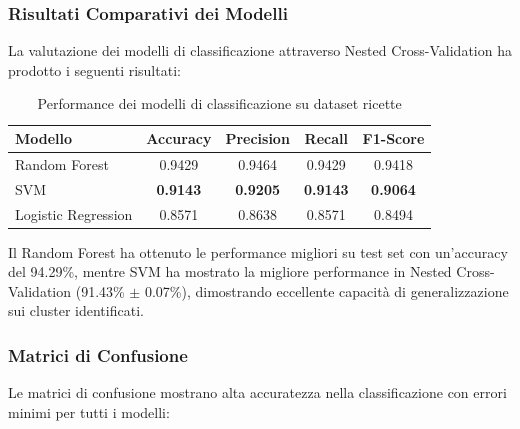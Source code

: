 \documentclass[12pt,a4paper]{article}
\begin{document}
\subsubsection{Risultati Comparativi dei Modelli}

La valutazione dei modelli di classificazione attraverso Nested Cross-Validation ha prodotto i seguenti risultati:

\begin{table}[H]
\centering
\begin{tabular}{@{}lcccc@{}}
\toprule
\textbf{Modello} & \textbf{Accuracy} & \textbf{Precision} & \textbf{Recall} & \textbf{F1-Score} \\
\midrule
Random Forest & 0.9429 & 0.9464 & 0.9429 & 0.9418 \\
SVM & \textbf{0.9143} & \textbf{0.9205} & \textbf{0.9143} & \textbf{0.9064} \\
Logistic Regression & 0.8571 & 0.8638 & 0.8571 & 0.8494 \\
\bottomrule
\end{tabular}
\caption{Performance dei modelli di classificazione su dataset ricette}
\label{tab:classification_results}
\end{table}

Il Random Forest ha ottenuto le performance migliori su test set con un'accuracy del 94.29\%, mentre SVM ha mostrato la migliore performance in Nested Cross-Validation (91.43\% $\pm$ 0.07\%), dimostrando eccellente capacit\`a di generalizzazione sui cluster identificati.

\subsubsection{Matrici di Confusione}

Le matrici di confusione mostrano alta accuratezza nella classificazione con errori minimi per tutti i modelli:
\end{document}
